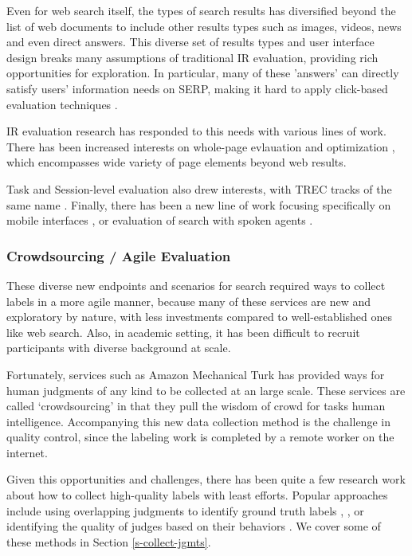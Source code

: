 \documentclass[openany]{now} %
\newcommand{\authornote}[3]{\marginpar{\tiny\color{#1}#2: #3}{\color{#1}{$\star$}}}
\newcommand{\emine}[1]{\authornote{green}{Emine}{#1}}
\begin{document}
Even for web search itself, the types of search results has diversified beyond the list of web documents to include other results types such as images, videos, news and even direct answers. This diverse set of results types and user interface design breaks many assumptions of traditional IR evaluation, providing rich opportunities for exploration. In particular, many of these 'answers' can directly satisfy users' information needs on SERP, making it hard to apply click-based evaluation techniques \cite{Li2009GA} \cite{diriye2012leaving}.

IR evaluation research has responded to this needs with various lines of work. There has been increased\emine{} interests on whole-page evlauation and optimization \cite{Zhou:2012}, which encompasses wide variety of page elements beyond web results. %

Task and Session-level evaluation \cite{KanoulasCCS11, CarteretteKHC14} also drew interests, with TREC tracks of the same name \cite{carterette2014overview}. Finally, there has been a new line of work focusing specifically on mobile interfaces \cite{VermaYC16}, or evaluation of search with spoken agents \cite{Kiseleva:2016}.

\subsubsection{Crowdsourcing / Agile Evaluation}

These diverse new endpoints and scenarios for search required ways to collect labels in a more agile manner, because many of these services are new and exploratory by nature, with less investments compared to well-established ones like web search. Also, in academic setting, it has been difficult to recruit participants with diverse background at scale.

Fortunately, services such as Amazon Mechanical Turk has provided ways for human judgments of any kind to be collected at an large scale. These services are called `crowdsourcing' in that they pull the wisdom of crowd for tasks human intelligence. Accompanying this new data collection method is the challenge in quality control, since the labeling work is completed by a remote worker on the internet.

Given this opportunities and challenges, there has been quite a few research work \cite{Alonso2012} about how to collect high-quality labels with least efforts. Popular approaches include using overlapping judgments to identify ground truth labels \cite{Venanzi:2014}, , or identifying the quality of judges based on their behaviors \cite{Kazai:2016}. We cover some of these methods in Section \ref{s-collect-jgmts}.
\end{document}

